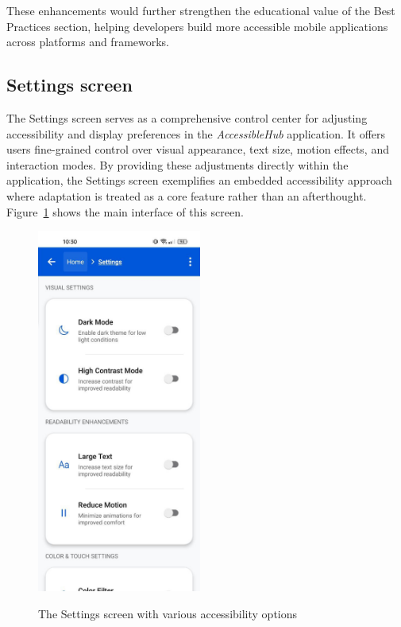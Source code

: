 These enhancements would further strengthen the educational value of the Best Practices section, helping developers build more accessible mobile applications across platforms and frameworks.

\subsection{Settings screen}
\label{subsec:settings-screen}

The Settings screen serves as a comprehensive control center for adjusting accessibility and display preferences in the \textit{AccessibleHub} application. It offers users fine-grained control over visual appearance, text size, motion effects, and interaction modes. By providing these adjustments directly within the application, the Settings screen exemplifies an embedded accessibility approach where adaptation is treated as a core feature rather than an afterthought. Figure~\ref{fig:settings_screen_main} shows the main interface of this screen.

\begin{figure}[ht]
    \centering
    \includegraphics[width=0.48\textwidth, alt={Settings screen showing accessibility options}]{img/settings_normal.jpg}
    \caption{The Settings screen with various accessibility options}
    \label{fig:settings_screen_main}
\end{figure}

